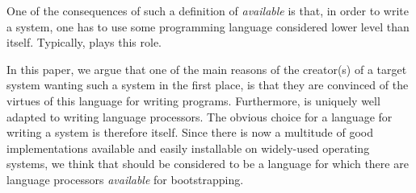 One of the consequences of such a definition of \emph{available} is
that, in order to write a \commonlisp{} system, one has to use
some programming language considered lower level than \commonlisp{}
itself.  Typically, \clanguage{} plays this role.

In this paper, we argue that one of the main reasons of the creator(s)
of a target \commonlisp{} system wanting such a system in the first
place, is that they are convinced of the virtues of this language for
writing programs.  Furthermore, \commonlisp{} is uniquely well adapted
to writing language processors.  The obvious choice for a language for
writing a \commonlisp{} system is therefore \commonlisp{} itself.
Since there is now a multitude of good \commonlisp{} implementations
available and easily installable on widely-used operating systems, we
think that \commonlisp{} should be considered to be a language for
which there are language processors \emph{available} for
bootstrapping.
